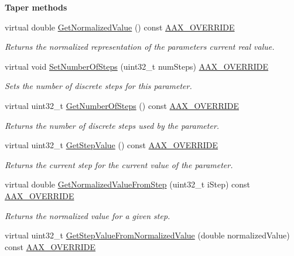 \begin{Indent}{\bf Taper methods}
\begin{DoxyCompactItemize}
virtual double \hyperlink{a00033_a3da77ce2df77961e918418fd2385a50f}{Get\+Normalized\+Value} () const \hyperlink{a00149_ac2f24a5172689ae684344abdcce55463}{A\+A\+X\+\_\+\+O\+V\+E\+R\+R\+I\+D\+E}
\begin{DoxyCompactList}\small\item\em Returns the normalized representation of the parameter\textquotesingle{}s current real value. \end{DoxyCompactList}\item 
virtual void \hyperlink{a00033_ac1c0ee92affe0379a58411955d27bb2b}{Set\+Number\+Of\+Steps} (uint32\+\_\+t num\+Steps) \hyperlink{a00149_ac2f24a5172689ae684344abdcce55463}{A\+A\+X\+\_\+\+O\+V\+E\+R\+R\+I\+D\+E}
\begin{DoxyCompactList}\small\item\em Sets the number of discrete steps for this parameter. \end{DoxyCompactList}\item 
virtual uint32\+\_\+t \hyperlink{a00033_afe660c842ca2bc05acb249def909e5e9}{Get\+Number\+Of\+Steps} () const \hyperlink{a00149_ac2f24a5172689ae684344abdcce55463}{A\+A\+X\+\_\+\+O\+V\+E\+R\+R\+I\+D\+E}
\begin{DoxyCompactList}\small\item\em Returns the number of discrete steps used by the parameter. \end{DoxyCompactList}\item 
virtual uint32\+\_\+t \hyperlink{a00033_a9743c6c0416e93078f377c40e9482021}{Get\+Step\+Value} () const \hyperlink{a00149_ac2f24a5172689ae684344abdcce55463}{A\+A\+X\+\_\+\+O\+V\+E\+R\+R\+I\+D\+E}
\begin{DoxyCompactList}\small\item\em Returns the current step for the current value of the parameter. \end{DoxyCompactList}\item 
virtual double \hyperlink{a00033_aa2ad88cfd15eae17f5ec18027e738950}{Get\+Normalized\+Value\+From\+Step} (uint32\+\_\+t i\+Step) const \hyperlink{a00149_ac2f24a5172689ae684344abdcce55463}{A\+A\+X\+\_\+\+O\+V\+E\+R\+R\+I\+D\+E}
\begin{DoxyCompactList}\small\item\em Returns the normalized value for a given step. \end{DoxyCompactList}\item 
virtual uint32\+\_\+t \hyperlink{a00033_ab6b9451a0dee2caa12829b1e7fca856b}{Get\+Step\+Value\+From\+Normalized\+Value} (double normalized\+Value) const \hyperlink{a00149_ac2f24a5172689ae684344abdcce55463}{A\+A\+X\+\_\+\+O\+V\+E\+R\+R\+I\+D\+E}

\end{DoxyCompactItemize}
\end{Indent}
